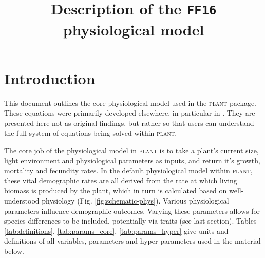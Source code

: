 \documentclass[10pt,twoside]{article}
\title{Description of the \texttt{FF16} physiological model}
\date{}
\newcommand{\plant}{\textsc{plant}}
\begin{document}
\maketitle

\tableofcontents

\section{Introduction}

This document outlines the core physiological model used in the {\plant}
package. These equations were primarily developed elsewhere, in particular in
\citet{Falster-2011}. They are presented here not as original findings,
but rather so that users can understand the full system of equations being
solved within {\plant}.

The core job of the physiological model in {\plant} is to take a plant's
current size, light environment and physiological parameters as inputs,
and return it's growth, mortality and fecundity rates. In the default
physiological model within {\plant}, these vital demographic rates are all
derived from the rate at which living biomass is produced by the plant,
which in turn is calculated based on well-understood physiology (Fig.
\ref{fig:schematic-phys}). Various physiological parameters
influence demographic outcomes. Varying these parameters allows for
species-differences to be included, potentially via traits (see last
section). Tables
\ref{tab:definitions}, \ref{tab:params_core},  \ref{tab:params_hyper} give
 units and definitions of all variables, parameters and hyper-parameters used in
 the material below.
\end{document}
